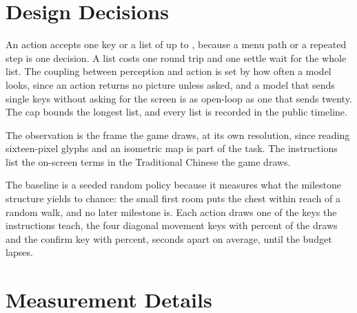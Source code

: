 \documentclass{article} %
\begin{document}
\begin{table}[!htb]
\centering
\caption{Each milestone in actions and minutes: the sessions that reached it and the median action count and minute at which they did.}
\label{tab:milestones}
\footnotesize

\end{table}

\begin{table}[!htb]
\centering
\caption{The four-hour sessions that count, one row per session: the minute of the last key, the actions sent, the minute at which each milestone was first reached, and the milestones credited. The crossing is timed by the service and the other milestones by the replay; a dash marks a milestone not reached.}
\label{tab:long}
\footnotesize
\setlength{\tabcolsep}{1.5pt}
\resizebox{\linewidth}{!}{}
\end{table}

\section{Design Decisions}
\label{app:design}

An action accepts one key or a list of up to \MmaxKeys{}, because a menu path or a repeated step is one decision. A list costs one round trip and one settle wait for the whole list. The coupling between perception and action is set by how often a model looks, since an action returns no picture unless asked, and a model that sends single keys without asking for the screen is as open-loop as one that sends twenty. The cap bounds the longest list, and every list is recorded in the public timeline.

The observation is the frame the game draws, at its own resolution, since reading sixteen-pixel glyphs and an isometric map is part of the task. The instructions list the on-screen terms in the Traditional Chinese the game draws.

The baseline is a seeded random policy because it measures what the milestone structure yields to chance: the small first room puts the chest within reach of a random walk, and no later milestone is. Each action draws one of the \QrandomKeys{} keys the instructions teach, the four diagonal movement keys with \QrandomMoveShare{} percent of the draws and the confirm key with \QrandomEnterShare{} percent, \QrandomPace{} seconds apart on average, until the budget lapses.


\section{Measurement Details}
\label{app:measure}
\end{document}
